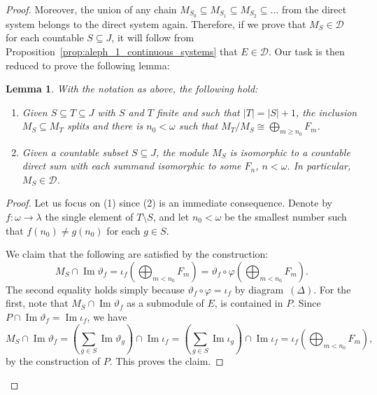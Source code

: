 \documentclass[a4paper,11pt]{amsart}
\newcommand{\st}{such that }
\DeclareMathOperator{\Img}{Im}
\newcommand{\D}{\mathcal{D}}
\newcommand{\card}[1]{\left\lvert{#1}\right\rvert}
\theoremstyle{plain}
\newtheorem{lem}[thm]{Lemma}
\theoremstyle{definition}
\theoremstyle{remark}
\begin{document}
\begin{proof}
Moreover, the union of any chain $M_{S_0} \subseteq M_{S_1} \subseteq M_{S_2} \subseteq \dots$ from the direct system belongs to the direct system again. Therefore, if we prove that $M_S \in \D$ for each countable $S \subseteq J$, it will follow from Proposition~\ref{prop:aleph_1_continuous_systems} that $E \in \D$. Our task is then reduced to prove the following lemma:

\begin{lem} \label{lem:inner_structure_of_E}
With the notation as above, the following hold:
%
\begin{enumerate}
\item Given $S \subseteq T \subseteq J$ with $S$ and $T$ finite and \st $\card{T} = \card{S}+1$, the inclusion $M_S \subseteq M_T$ splits and there is $n_0 < \omega$ \st $M_T/M_S \cong \bigoplus_{m \ge n_0} F_m$.
\item Given a countable subset $S \subseteq J$, the module $M_S$ is isomorphic to a countable direct sum with each summand isomorphic to some $F_n$, $n<\omega$. In particular, $M_S \in \D$.
\end{enumerate}
\end{lem}

\begin{proof}
Let us focus on (1) since (2) is an immediate consequence. Denote by $f: \omega \to \lambda$ the single element of $T \setminus S$, and let $n_0 < \omega$ be the smallest number \st $f(n_0) \ne g(n_0)$ for each $g \in S$.

We claim that the following are satisfied by the construction:
%
$$
M_S \cap \Img \vartheta_f =
\iota_f\left(\bigoplus_{m<n_0} F_m\right) =
\vartheta_f \circ \varphi\left(\bigoplus_{m<n_0} F_m\right).
$$
%
The second equality holds simply because $\vartheta_f \circ \varphi = \iota_f$ by diagram~$(\Delta)$. For the first, note that 
$M_S \cap \Img \vartheta_f $
as a submodule of $E$, is contained in $P$. Since $P \cap \Img \vartheta_f = \Img \iota_f$, we have
%
$$ M_S \cap \Img \vartheta_f =\left(\sum_{g \in S} \Img \vartheta_g\right) \cap \Img \iota_f =\left(\sum_{g \in S} \Img \iota_g\right) \cap \Img \iota_f = \iota_f\left(\bigoplus_{m<n_0} F_m\right), $$
%
by the construction of $P$. This proves the claim.


\end{proof}
\end{proof}
\end{document}
